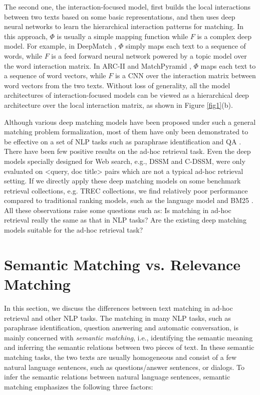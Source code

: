 \documentclass{sig-alternate-05-2015}
\begin{document}
The second one, the interaction-focused model, first builds the local interactions between two texts based on some basic representations, and then uses deep neural networks to learn the hierarchical interaction patterns for matching. In this approach, $\Phi$ is usually a simple mapping function while $F$ is a complex deep model. For example, in DeepMatch \cite{lu2013deep}, $\Phi$ simply maps each text to a sequence of words, while $F$ is a feed forward neural network powered by a topic model over the word interaction matrix. In ARC-II \cite{hu2014convolutional} and MatchPyramid \cite{pang2016text}, $\Phi$ maps each text to a sequence of word vectors, while $F$ is a CNN over the interaction matrix between word vectors from the two texts. Without loss of generality, all the model architectures of interaction-focused models can be viewed as a hierarchical deep architecture over the local interaction matrix, as shown in Figure \ref{fig1}(b).

Although various deep matching models have been proposed under such a general matching problem formalization, most of them have only been demonstrated to be effective on a set of NLP tasks such as paraphrase identification and QA \cite{hu2014convolutional,wan2015deep}. There have been few positive results on the ad-hoc retrieval task. Even the deep models specially designed for Web search, e.g., DSSM and C-DSSM, were only evaluated on <query, doc title> pairs which are not a typical ad-hoc retrieval setting. If we directly apply these deep matching models on some benchmark retrieval collections, e.g. TREC collections, we find relatively poor performance compared to traditional ranking models, such as the language model \cite{zhai2001study} and BM25 \cite{robertson1994some}. All these observations raise some questions such as: Is matching in ad-hoc retrieval really the same as that in NLP tasks? Are the existing deep matching models suitable for the ad-hoc retrieval task?

\section{Semantic Matching vs. Relevance Matching}
In this section, we discuss the differences between text matching in ad-hoc retrieval and other NLP tasks. The matching in many NLP tasks, such as paraphrase identification, question answering and automatic conversation, is mainly concerned with \textit{semantic matching}, i.e., identifying the semantic meaning and inferring the semantic relations between two pieces of text. In these semantic matching tasks, the two texts are usually homogeneous and consist of a few natural language sentences, such as questions/answer sentences, or dialogs. To infer the semantic relations between natural language sentences, semantic matching emphasizes the following three factors:
\end{document}
